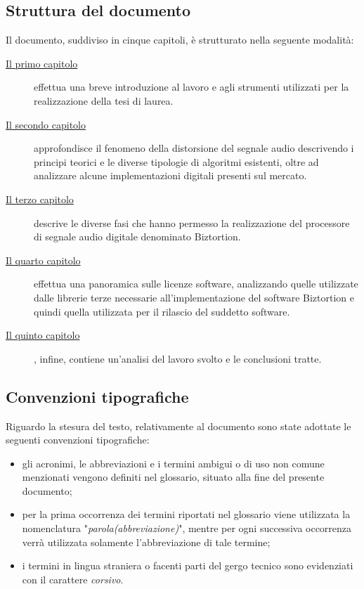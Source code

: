 \subsection{Struttura del documento}
Il documento, suddiviso in cinque capitoli, è strutturato nella seguente modalità:
\begin{description}
    \item[{\hyperref[cap:introduzione]{Il primo capitolo}}] effettua una breve introduzione al lavoro e agli strumenti utilizzati per la realizzazione della tesi di laurea.

    \item[{\hyperref[cap:distorsione]{Il secondo capitolo}}] approfondisce il fenomeno della distorsione del segnale audio descrivendo i principi teorici e le diverse tipologie di algoritmi esistenti, oltre ad analizzare alcune implementazioni digitali presenti sul mercato.
    
    \item[{\hyperref[cap:biztortion]{Il terzo capitolo}}] descrive le diverse fasi che hanno permesso la realizzazione del processore di segnale audio digitale denominato Biztortion.
    
    \item[{\hyperref[cap:licenze-software]{Il quarto capitolo}}] effettua una panoramica sulle licenze software, analizzando quelle utilizzate dalle librerie terze necessarie all'implementazione del software Biztortion e quindi quella utilizzata per il rilascio del suddetto software.
    
    \item[{\hyperref[cap:conclusioni]{Il quinto capitolo}}], infine, contiene un'analisi del lavoro svolto e le conclusioni tratte.
\end{description}

\subsection{Convenzioni tipografiche}
Riguardo la stesura del testo, relativamente al documento sono state adottate le seguenti convenzioni tipografiche:
\begin{itemize}
	\item gli acronimi, le abbreviazioni e i termini ambigui o di uso non comune menzionati vengono definiti nel glossario, situato alla fine del presente documento;
	\item per la prima occorrenza dei termini riportati nel glossario viene utilizzata la nomenclatura "\emph{parola(abbreviazione)}", mentre per ogni successiva occorrenza verrà utilizzata solamente l'abbreviazione di tale termine;
	\item i termini in lingua straniera o facenti parti del gergo tecnico sono evidenziati con il carattere \emph{corsivo}.
\end{itemize}